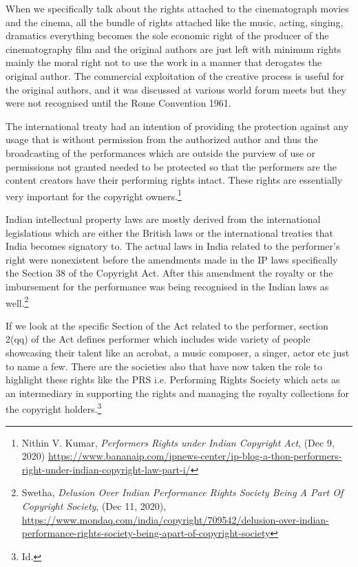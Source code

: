 \begin{multicols}{2}
\vspace{-.1cm}

\noi
When we specifically talk about the rights attached to the cinematograph movies and the
cinema, all the bundle of rights attached like the music, acting, singing, dramatics everything
becomes the sole economic right of the producer of the cinematography film and the original
authors are just left with minimum rights mainly the moral right not to use the work in a
manner that derogates the original author. The commercial exploitation of the creative
process is useful for the original authors, and it was discussed at various world forum meets
but they were not recognised until the Rome Convention 1961.

\vspace{-.1cm}

\noi
The international treaty had an intention of providing the protection against any usage that is
without permission from the authorized author and thus the broadcasting of the performances
which are outside the purview of use or permissions not granted needed to be protected so
that the performers are the content creators have their performing rights intact. These rights
are essentially very important for the copyright owners.\footnote{Nithin V. Kumar, \textit{Performers Rights under Indian Copyright Act}, (Dec 9, 2020) \url{https://www.bananaip.com/ipnews-center/ip-blog-a-thon-performers-right-under-indian-copyright-law-part-i/}}

\vspace{-.1cm}

\noi
Indian intellectual property laws are mostly derived from the international legislations which
are either the British laws or the international treaties that India becomes signatory to. The
actual laws in India related to the performer’s right were nonexistent before the amendments
made in the IP laws specifically the Section 38 of the Copyright Act. After this amendment
the royalty or the imbursement for the performance was being recognised in the Indian laws
as well.\footnote{Swetha, \textit{Delusion Over Indian Performance Rights Society Being A Part Of Copyright Society}, (Dec 11, 2020),\\
\url{https://www.mondaq.com/india/copyright/709542/delusion-over-indian-performance-rights-society-being-apart-of-copyright-society}}

\vspace{-.1cm}

\noi
If we look at the specific Section of the Act related to the performer, section 2(qq) of the Act
defines performer which includes wide variety of people showcasing their talent like an
acrobat, a music composer, a singer, actor etc just to name a few. There are the societies also
that have now taken the role to highlight these rights like the PRS i.e. Performing Rights
Society which acts as an intermediary in supporting the rights and managing the royalty
collections for the copyright holders.\footnote{Id.}


\end{multicols}
